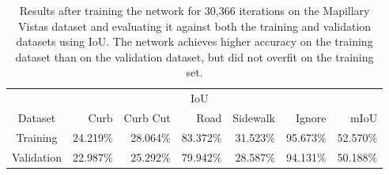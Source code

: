 \begin{table}[]
	\centering
\begin{tabular}{@{}crrrrrr@{}}
	\toprule
	& \multicolumn{5}{c}{IoU} &  \\ \cmidrule(lr){2-6}
	Dataset & Curb & Curb Cut & Road & Sidewalk & Ignore & mIoU \\ \midrule
	Training & 24.219\% & 28.064\% & 83.372\% & 31.523\% & 95.673\% & 52.570\% \\
	Validation & 22.987\% & 25.292\% & 79.942\% & 28.587\% & 94.131\% & 50.188\% \\ \bottomrule
\end{tabular}
\caption[Network Results]{Results after training the network for 30,366 iterations on the Mapillary Vistas dataset \cite{mapillary} and evaluating it against both the training and validation datasets using IoU. The network achieves higher accuracy on the training dataset than on the validation dataset, but did not overfit on the training set.}
\label{tab:mapillary-results}
\end{table}